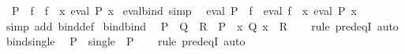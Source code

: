 \begin{isabellebody}
\ \ {\isachardoublequoteopen}P\ {\isasymbind}\ f\ {\isacharequal}{\kern0pt}\ {\isacharparenleft}{\kern0pt}{\isasymSqunion}{\isacharparenleft}{\kern0pt}f\ {\isacharbackquote}{\kern0pt}\ {\isacharbraceleft}{\kern0pt}x{\isachardot}{\kern0pt}\ eval\ P\ x{\isacharbraceright}{\kern0pt}{\isacharparenright}{\kern0pt}{\isacharparenright}{\kern0pt}{\isachardoublequoteclose}\isanewline
\isanewline
{}\isamarkupfalse%
\ eval{\isacharunderscore}{\kern0pt}bind\ {\isacharbrackleft}{\kern0pt}simp{\isacharbrackright}{\kern0pt}{\isacharcolon}{\kern0pt}\isanewline
\ \ {\isachardoublequoteopen}eval\ {\isacharparenleft}{\kern0pt}P\ {\isasymbind}\ f{\isacharparenright}{\kern0pt}\ {\isacharequal}{\kern0pt}\ eval\ {\isacharparenleft}{\kern0pt}{\isasymSqunion}{\isacharparenleft}{\kern0pt}f\ {\isacharbackquote}{\kern0pt}\ {\isacharbraceleft}{\kern0pt}x{\isachardot}{\kern0pt}\ eval\ P\ x{\isacharbraceright}{\kern0pt}{\isacharparenright}{\kern0pt}{\isacharparenright}{\kern0pt}{\isachardoublequoteclose}\isanewline
%
\isadelimproof
\ \ %
\endisadelimproof
%
\isatagproof
{}\isamarkupfalse%
\ {\isacharparenleft}{\kern0pt}simp\ add{\isacharcolon}{\kern0pt}\ bind{\isacharunderscore}{\kern0pt}def{\isacharparenright}{\kern0pt}%
\endisatagproof
{\isafoldproof}%
%
\isadelimproof
\isanewline
%
\endisadelimproof
\isanewline
{}\isamarkupfalse%
\ bind{\isacharunderscore}{\kern0pt}bind{\isacharcolon}{\kern0pt}\isanewline
\ \ {\isachardoublequoteopen}{\isacharparenleft}{\kern0pt}P\ {\isasymbind}\ Q{\isacharparenright}{\kern0pt}\ {\isasymbind}\ R\ {\isacharequal}{\kern0pt}\ P\ {\isasymbind}\ {\isacharparenleft}{\kern0pt}{\isasymlambda}x{\isachardot}{\kern0pt}\ Q\ x\ {\isasymbind}\ R{\isacharparenright}{\kern0pt}{\isachardoublequoteclose}\isanewline
%
\isadelimproof
\ \ %
\endisadelimproof
%
\isatagproof
{}\isamarkupfalse%
\ {\isacharparenleft}{\kern0pt}rule\ pred{\isacharunderscore}{\kern0pt}eqI{\isacharparenright}{\kern0pt}\ auto%
\endisatagproof
{\isafoldproof}%
%
\isadelimproof
\isanewline
%
\endisadelimproof
\isanewline
{}\isamarkupfalse%
\ bind{\isacharunderscore}{\kern0pt}single{\isacharcolon}{\kern0pt}\isanewline
\ \ {\isachardoublequoteopen}P\ {\isasymbind}\ single\ {\isacharequal}{\kern0pt}\ P{\isachardoublequoteclose}\isanewline
%
\isadelimproof
\ \ %
\endisadelimproof
%
\isatagproof
{}\isamarkupfalse%
\ {\isacharparenleft}{\kern0pt}rule\ pred{\isacharunderscore}{\kern0pt}eqI{\isacharparenright}{\kern0pt}\ auto%
\endisatagproof
{\isafoldproof}%
%
\isadelimproof
\isanewline
%
\endisadelimproof
\isanewline

\end{isabellebody}
